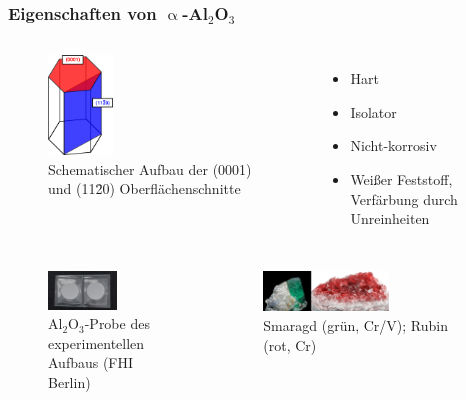 \documentclass[hyperref={pdfpagelabels=false}]{beamer}
\begin{document}
\begin{frame}
 \frametitle{Eigenschaften von $\upalpha$-Al$_2$O$_3$}
 \begin{columns}
  \begin{figure}
  \includegraphics[width=0.3\textwidth]{figures/al2o3-crystal.png}
  \caption{Schematischer Aufbau der (0001) und (11\=20) Oberflächenschnitte}
  \end{figure}
  \begin{itemize}
  \item Hart
  \item Isolator
  \item Nicht-korrosiv
  \item Weißer Feststoff, Verfärbung durch Unreinheiten
  \end{itemize}
 \end{columns}
 \pause
\begin{columns}
  \begin{figure}
  \includegraphics[width=0.6\textwidth]{figures/Al2O3.jpg}
  \caption{Al$_2$O$_3$-Probe des experimentellen Aufbaus (FHI Berlin)}
 \end{figure}
   \begin{figure}
  \includegraphics[width=0.6\textwidth]{figures/emerald-ruby.eps}
  \caption{Smaragd (grün, Cr/V); Rubin (rot, Cr)}
  \end{figure}
 \end{columns}
\end{frame}
\end{document}
